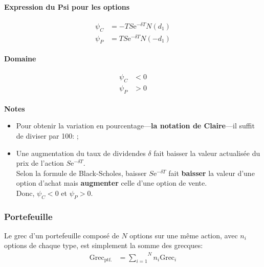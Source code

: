 \documentclass[10pt, french]{article}
\begin{document}
\begin{multicols*}{2}
\begin{definitionNOHFILL}[Psi $\psi	=	\deriv{\delta}{V}$]
\begin{minipage}[ht]{0.5\linewidth}
\begin{center}
	\textbf{Expression du Psi pour les options}
\end{center}
\begin{gather}
\begin{align*}
	\psi_{C}
	&=	- T S \textrm{e}^{-\delta T} N(d_{1})	\\
	\psi_{P}
	&=	T S \textrm{e}^{-\delta T} N(-d_{1})
\end{align*}
\end{gather}
\end{minipage}
\begin{minipage}[ht]{0.5\linewidth}
\begin{center}
	\textbf{Domaine}
\end{center}
\begin{gather}
\begin{align*}
	\psi_{C}	&<	0	\\
	\psi_{P}	&>	0
\end{align*}
\end{gather}
\end{minipage}

\tcbline

\begin{center}
	\textbf{Notes}
\end{center}
\begin{itemize}[leftmargin = *]
	\item	Pour obtenir la variation en pourcentage---\textbf{la notation de Claire}---il suffit de diviser par 100: ;
	\item	Une augmentation du taux de dividendes $\delta$ fait baisser la valeur actualisée du prix de l'action $S\textrm{e}^{-\delta T}$.\\
			Selon la formule de Black-Scholes, baisser $S\textrm{e}^{-\delta T}$ fait \textbf{baisser} la valeur d'une option d'achat mais \textbf{augmenter} celle d'une option de vente.\\
			Donc, $\psi_{C} < 0$ et $\psi_{P} > 0$.
\end{itemize}
\end{definitionNOHFILL}

\subsubsection*{Portefeuille}

Le grec d'un portefeuille composé de $N$ options sur une même action, avec $n_{i}$ options de chaque type, est simplement la somme des grecques:
\begin{align*}
	\text{Grec}_{\text{ptf.}}
	&=	\overset{N}{\underset{i = 1}{\sum}} n_{i} \text{Grec}_{i}	
\end{align*}


\end{multicols*}
\end{document}
